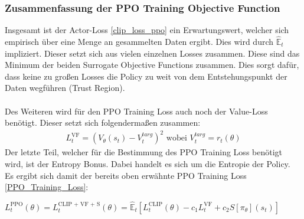 \subsubsection{Zusammenfassung der PPO Training Objective Function}
Insgesamt ist der Actor-Loss \ref{clip_loss_ppo} ein Erwartungswert, welcher sich empirisch über eine Menge an gesammelten Daten ergibt. Dies wird durch $\mathbb{\hat{E}}_{t}$ impliziert. Dieser setzt sich aus vielen einzelnen Losses zusammen. Diese sind das Minimum der beiden Surrogate Objective Functions zusammen. Dies sorgt dafür, dass keine zu großen Losses die Policy zu weit von dem Entstehungspunkt der Daten wegführen (Trust Region). \cite[S. 3f.]{PPO}\\
\\Des Weiteren wird für den PPO Training Loss auch noch der Value-Loss benötigt. Dieser setzt sich folgendermaßen zusammen:
\begin{align}
	L^{\text{VF}}_{t} = (V_{\theta}(s_{t})-V_{t}^{targ})^2 \text{ wobei } V_{t}^{targ} = r_{t}(\theta)
\end{align} 
Der letzte Teil, welcher für die Bestimmung des PPO Training Loss benötigt wird, ist der Entropy Bonus. Dabei handelt es sich um die Entropie der Policy.\\
Es ergibt sich damit der bereits oben erwähnte PPO Training Loss \ref{PPO_Training_Loss}:
\begin{center}
	$L^\text{PPO}_{t} (\theta) = L^\text{CLIP + VF + S}_{t} (\theta) = \mathbb{\hat{E}}_{t} [L^{\text{CLIP}}_{t}(\theta) - c_{1}L^{\text{VF}}_{t} + c_{2}S[\pi_{\theta}](s_{t})]$
\end{center}


